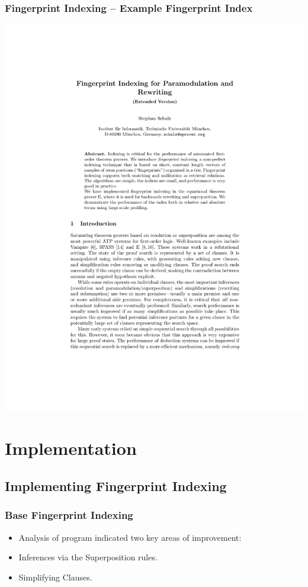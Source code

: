 \documentclass[10pt,xcolor={dvipsnames}]{beamer}
\begin{document}
\begin{NoHyper}
\begin{frame}
  \frametitle{Fingerprint Indexing -- Example Fingerprint Index}
  \includegraphics[page=7,scale=0.7,trim=4cm 13.5cm 5cm 4.5cm,clip]{schulz_fp-index_ext}
\end{frame}
\section{Implementation}

\subsection{Implementing Fingerprint Indexing}
\begin{frame}
  \frametitle{Base Fingerprint Indexing}
  \begin{itemize}
  \item<1-> Analysis of program indicated two key areas of improvement:
  \item<2-> Inferences via the Superposition rules.
  \item<2-> Simplifying Clauses.
  \end{itemize}
\end{frame}


\end{NoHyper}
\end{document}
